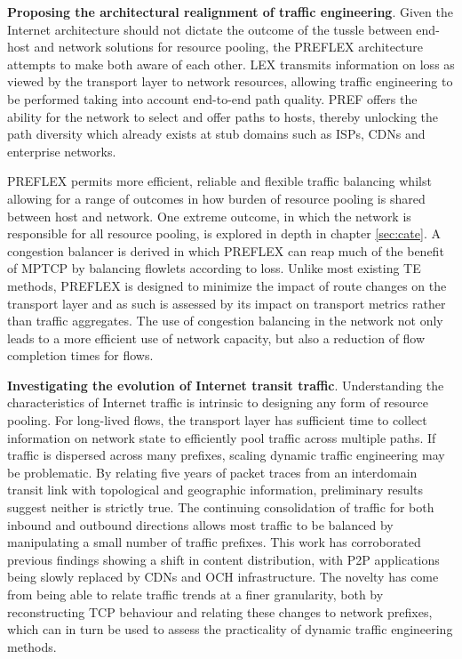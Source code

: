 \textbf{Proposing the architectural realignment of traffic engineering}.
Given the Internet architecture should not dictate the outcome of the tussle between end-host and network solutions for resource pooling, the \ac{PREFLEX} architecture attempts to make both aware of each other.
\acf{LEX} transmits information on loss as viewed by the transport layer to network resources, allowing traffic engineering to be performed taking into account end-to-end path quality.
\acf{PREF} offers the ability for the network to select and offer paths to hosts, thereby unlocking the path diversity which already exists at stub domains such as \acp{ISP}, \acp{CDN} and enterprise networks.

\ac{PREFLEX} permits more efficient, reliable and flexible traffic balancing whilst allowing for a range of outcomes in how burden of resource pooling is shared between host and network.
One extreme outcome, in which the network is responsible for all resource pooling, is explored in depth in chapter \ref{sec:cate}.
A congestion balancer is derived in which \ac{PREFLEX} can reap much of the benefit of \ac{MPTCP} by balancing flowlets according to loss.
Unlike most existing \ac{TE} methods, \ac{PREFLEX} is designed to minimize the impact of route changes on the transport layer and as such is assessed by its impact on transport metrics rather than traffic aggregates.
The use of congestion balancing in the network not only leads to a more efficient use of network capacity, but also a reduction of flow completion times for flows.

\textbf{Investigating the evolution of Internet transit traffic}.
Understanding the characteristics of Internet traffic is intrinsic to designing any form of resource pooling.
For long-lived flows, the transport layer has sufficient time to collect information on network state to efficiently pool traffic across multiple paths.
If traffic is dispersed across many prefixes, scaling dynamic traffic engineering may be problematic.
By relating five years of packet traces from an interdomain transit link with topological and geographic information, preliminary results suggest neither is strictly true.
The continuing consolidation of traffic for both inbound and outbound directions allows most traffic to be balanced by manipulating a small number of traffic prefixes.
This work has corroborated previous findings \cite{Labovitz:2010p175} showing a shift in content distribution, with \acf{P2P} applications being slowly replaced by \acfp{CDN} and \acf{OCH} infrastructure.
The novelty has come from being able to relate traffic trends at a finer granularity, both by reconstructing \ac{TCP} behaviour and relating these changes to network prefixes, which can in turn be used to assess the practicality of dynamic traffic engineering methods.

